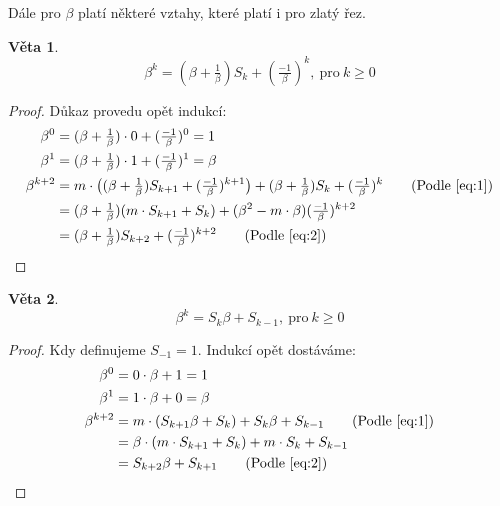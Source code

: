 \documentclass{article}
\newtheorem{veta}{Věta}[section]
\theoremstyle{definition}
\theoremstyle{definition}
\theoremstyle{remark}
\numberwithin{equation}{section}
\begin{document}
Dále pro $\beta$ platí některé vztahy, které platí i pro zlatý řez.\\

\begin{veta}
	\begin{equation} \label{eq:4}
		\beta^k = (\beta + \tfrac{1}{\beta}) S_k + (\tfrac{-1}{\beta})^k,\ \text{pro}\ k \geq 0
	\end{equation}
\end{veta}

\begin{proof}
	Důkaz provedu opět indukcí:
	\begin{align*}
		\beta^0       & = (\beta + \tfrac{1}{\beta}) \cdot 0 + (\tfrac{-1}{\beta})^0 = 1                                                                                                           \\
		\beta^1       & = (\beta + \tfrac{1}{\beta}) \cdot 1 + (\tfrac{-1}{\beta})^1 = \beta                                                                                                       \\
		\beta^{k + 2} & = m \cdot \big( (\beta + \tfrac{1}{\beta}) S_{k + 1} + (\tfrac{-1}{\beta})^{k + 1} \big) + (\beta + \tfrac{1}{\beta}) S_k + (\tfrac{-1}{\beta})^k \tag{Podle \eqref{eq:1}} \\
		              & = (\beta + \tfrac{1}{\beta}) (m \cdot S_{k + 1} + S_k) + (\beta^2 - m \cdot \beta) (\tfrac{-1}{\beta})^{k + 2}                                                             \\
		              & = (\beta + \tfrac{1}{\beta})  S_{k + 2} + (\tfrac{-1}{\beta})^{k + 2} \tag{Podle \eqref{eq:2}}
	\end{align*}
\end{proof}


\begin{veta}
	\begin{equation} \label{eq:5}
		\beta^k = S_k \beta + S_{k - 1},\ \text{pro}\ k \geq 0
	\end{equation}
\end{veta}

\begin{proof}
	Kdy definujeme $S_{-1} = 1$. Indukcí opět dostáváme:
	\begin{align*}
		\beta^0       & = 0 \cdot \beta + 1 = 1                                                            \\
		\beta^1       & = 1 \cdot \beta + 0 = \beta                                                        \\
		\beta^{k + 2} & = m \cdot (S_{k + 1} \beta + S_k) + S_k \beta + S_{k - 1} \tag{Podle \eqref{eq:1}} \\
		              & = \beta \cdot (m \cdot S_{k + 1} + S_k) + m \cdot S_k + S_{k - 1}                  \\
		              & = S_{k + 2} \beta + S_{k + 1}  \tag{Podle \eqref{eq:2}}                            \\
	\end{align*}
\end{proof}
\end{document}
